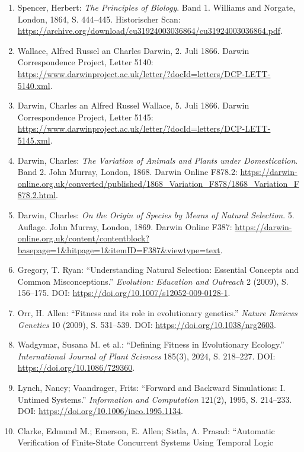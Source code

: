 \documentclass[
  10pt,
  a4paper,
]{article}
\providecommand{\tightlist}{%
  \setlength{\itemsep}{0pt}\setlength{\parskip}{0pt}}
\begin{document}
\begingroup
\small
\begin{enumerate}
\def\labelenumi{\arabic{enumi}.}
\tightlist
\item
  Spencer, Herbert: \emph{The Principles of Biology}. Band 1. Williams
  and Norgate, London, 1864, S. 444--445. Historischer Scan:
  \url{https://archive.org/download/cu31924003036864/cu31924003036864.pdf}.
\item
  Wallace, Alfred Russel an Charles Darwin, 2. Juli 1866. Darwin
  Correspondence Project, Letter 5140:
  \url{https://www.darwinproject.ac.uk/letter/?docId=letters/DCP-LETT-5140.xml}.
\item
  Darwin, Charles an Alfred Russel Wallace, 5. Juli 1866. Darwin
  Correspondence Project, Letter 5145:
  \url{https://www.darwinproject.ac.uk/letter/?docId=letters/DCP-LETT-5145.xml}.
\item
  Darwin, Charles: \emph{The Variation of Animals and Plants under
  Domestication}. Band 2. John Murray, London, 1868. Darwin Online
  F878.2:
  \url{https://darwin-online.org.uk/converted/published/1868_Variation_F878/1868_Variation_F878.2.html}.
\item
  Darwin, Charles: \emph{On the Origin of Species by Means of Natural
  Selection}. 5. Auflage. John Murray, London, 1869. Darwin Online F387:
  \url{https://darwin-online.org.uk/content/contentblock?basepage=1\&hitpage=1\&itemID=F387\&viewtype=text}.
\item
  Gregory, T. Ryan: ``Understanding Natural Selection: Essential
  Concepts and Common Misconceptions.'' \emph{Evolution: Education and
  Outreach} 2 (2009), S. 156--175. DOI:
  \url{https://doi.org/10.1007/s12052-009-0128-1}.
\item
  Orr, H. Allen: ``Fitness and its role in evolutionary genetics.''
  \emph{Nature Reviews Genetics} 10 (2009), S. 531--539. DOI:
  \url{https://doi.org/10.1038/nrg2603}.
\item
  Wadgymar, Susana M. et al.: ``Defining Fitness in Evolutionary
  Ecology.'' \emph{International Journal of Plant Sciences} 185(3),
  2024, S. 218--227. DOI:
  \url{https://doi.org/10.1086/729360}.
\item
  Lynch, Nancy; Vaandrager, Frits: ``Forward and Backward Simulations:
  I. Untimed Systems.'' \emph{Information and Computation} 121(2), 1995,
  S. 214--233. DOI: \url{https://doi.org/10.1006/inco.1995.1134}.
\item
  Clarke, Edmund M.; Emerson, E. Allen; Sistla, A. Prasad: ``Automatic
  Verification of Finite-State Concurrent Systems Using Temporal Logic

\end{enumerate}
\end{document}
